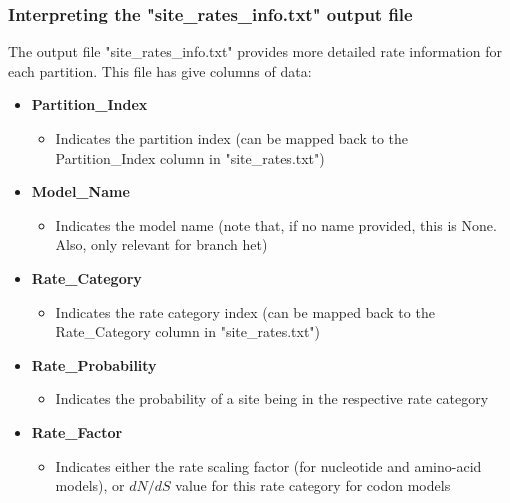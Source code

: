 \documentclass{article}
\begin{document}
\subsubsection{Interpreting the "site\_rates\_info.txt" output file}\label{sec:infofile}
The output file "site\_rates\_info.txt" provides more detailed rate information for each partition. This file has give columns of data:
\begin{itemize}
	\item \textbf{Partition\_Index}
	\begin{itemize}
		\item Indicates the partition index (can be mapped back to the Partition\_Index column in "site\_rates.txt")
	\end{itemize}
	\item \textbf{Model\_Name}
	\begin{itemize}
		\item Indicates the model name (note that, if no name provided, this is None. Also, only relevant for branch het)
	\end{itemize}
	\item \textbf{Rate\_Category}
	\begin{itemize}
		\item Indicates the rate category index (can be mapped back to the Rate\_Category column in "site\_rates.txt")
	\end{itemize}
	\item \textbf{Rate\_Probability}
	\begin{itemize}
		\item Indicates the probability of a site being in the respective rate category
	\end{itemize}
	\item \textbf{Rate\_Factor}
	\begin{itemize}
		\item Indicates either the rate scaling factor (for nucleotide and amino-acid models), or $dN/dS$ value for this rate category for codon models
	\end{itemize}
\end{itemize}

\end{document}
